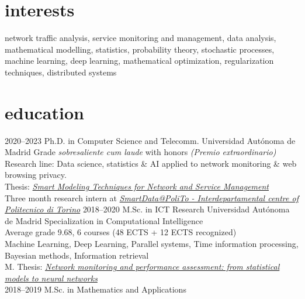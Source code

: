\documentclass[]{friggeri-cv}
\begin{document}
\section{interests}

network traffic analysis, service monitoring and management, data analysis, mathematical modelling, statistics, probability theory, stochastic processes, machine learning, deep learning, mathematical optimization, regularization techniques, distributed systems

\section{education}

\begin{entrylist}
\entry
    {2020–2023}
    {Ph.D. in Computer Science and Telecomm.}
    {Universidad Autónoma de Madrid}
    {Grade \textit{sobresaliente cum laude} with honors \emph{(Premio extraordinario)}\\
    Research line: Data science, statistics \& AI applied to network monitoring \& web browsing privacy.\\
    Thesis: \href{https://repositorio.uam.es/bitstream/handle/10486/712298/perdices_burrero_daniel.pdf?sequence=1&isAllowed=y}{\emph{Smart Modeling Techniques for Network and Service Management}}\\
    Three month research intern at \href{https://smartdata.polito.it/}{\emph{SmartData@PoliTo - Interdepartamental centre of Politecnico di Torino}}
    }
\entry
    {2018–2020}
    {M.Sc. in ICT Research}
    {Universidad Autónoma de Madrid}
    {Specialization in Computational Intelligence\\
    Average grade 9.68, 6 courses (48 ECTS + 12 ECTS recognized) \\
    Machine Learning, Deep Learning, Parallel systems, Time information processing, Bayesian methods, Information retrieval \\
    M. Thesis: \href{https://repositorio.uam.es/bitstream/handle/10486/692579/perdices_burrero_daniel_tfm.pdf?sequence=1&isAllowed=y}{\emph{Network monitoring and performance assessment: from statistical models to neural networks}}\\%
    }
  \entry
    {2018–2019}
    {M.Sc. in Mathematics and Applications}

\end{entrylist}
\end{document}
